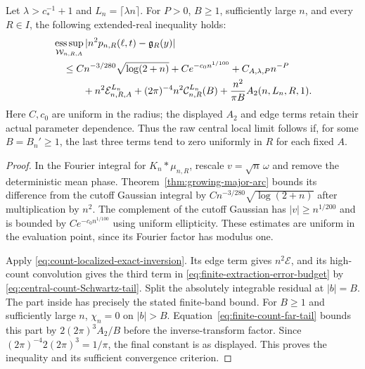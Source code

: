 \begin{corollary}
\label{cor:finite-extraction-error-budget}
Let $\lambda>c_*^{-1}+1$ and $L_n=\lceil\lambda n\rceil$.
For $P>0$, $B\ge1$, sufficiently large $n$, and every $R\in I$,
the following extended-real inequality holds:
\begin{align}
 &\mathop{\rm ess\,sup}_{\mathcal W_{n,R,A}}
       |n^2p_{n,R}(\ell,t)-\mathfrak g_R(y)|\notag\\
 &\quad\le C n^{-3/280}\sqrt{\log(2+n)}
              +Ce^{-c_0n^{1/100}}
              +C_{A,\lambda,P}n^{-P}\notag\\
 &\qquad\quad+n^2\mathcal E_{n,R,A}^{L_n}
       +(2\pi)^{-4}n^2\mathcal C_{n,R}^{L_n}(B)
       +\frac{n^2}{\pi B}A_2(n,L_n,R,1).
 \label{eq:finite-extraction-error-budget}
\end{align}
Here $C,c_0$ are uniform in the radius; the displayed $A_2$ and edge
terms retain their actual parameter dependence. Thus the raw central
local limit follows if, for some $B=B_n'\ge1$, the last three terms
tend to zero uniformly in $R$ for each fixed $A$.
\end{corollary}
\begin{proof}
In the Fourier integral for $K_n*\mu_{n,R}$, rescale
$v=\sqrt n\,\omega$ and remove the deterministic mean phase.
Theorem~\ref{thm:growing-major-arc} bounds its difference from the
cutoff Gaussian integral by
$C n^{-3/280}\sqrt{\log(2+n)}$ after multiplication by $n^2$.
The complement of the cutoff Gaussian has $|v|\ge n^{1/200}$ and is
bounded by $Ce^{-c_0 n^{1/100}}$ using uniform ellipticity.
These estimates are uniform in the evaluation point, since its Fourier
factor has modulus one.

Apply \eqref{eq:count-localized-exact-inversion}. Its edge term gives
$n^2\mathcal E$, and its high-count convolution gives the third term
in \eqref{eq:finite-extraction-error-budget} by
\eqref{eq:central-count-Schwartz-tail}. Split the absolutely
integrable residual at $|b|=B$. The part inside has precisely the stated
finite-band bound. For $B\ge1$ and sufficiently large $n$, $\chi_n=0$
on $|b|>B$. Equation~\eqref{eq:finite-count-far-tail} bounds this part
by $2(2\pi)^3A_2/B$ before the inverse-transform factor. Since
$(2\pi)^{-4}2(2\pi)^3=1/\pi$, the final constant is as displayed.
This proves the inequality and its sufficient convergence criterion.
\end{proof}

